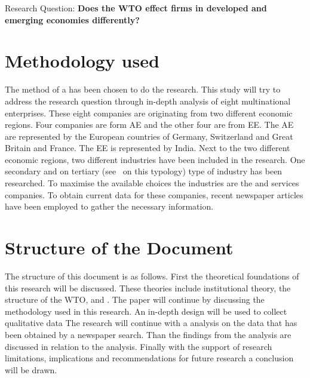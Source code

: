 Research Question: \textbf{Does the WTO effect firms in developed and emerging economies differently?}

\section{Methodology used}
The method of a \mcs has been chosen to do the research.
This study will try to address the research question through in-depth \mcs analysis of eight  multinational enterprises.
These eight companies are originating from two different economic regions.
Four companies are form \gls{AE} and the other four are from \gls{EE}.
The AE are represented by the European countries of Germany, Switzerland and Great Britain and France.
The EE is represented by India.
Next to the two different economic regions, two different industries have been included in the research.
One secondary and on tertiary (see~\cite{Fisher:1939} on this typology) type of industry has been researched.
To maximise the available choices the industries are the \manu and services companies.
To obtain current data for these companies, recent newspaper articles have been employed to gather the necessary information.


\section{Structure of the Document}

The structure of this document is as follows. 
First the theoretical foundations of this research will be discussed. 
These theories include institutional theory, the structure of the WTO, and .
The paper will continue by discussing the methodology used in this research.
An in-depth \mcs design will be used to collect qualitative data 
The research will continue with a analysis on the data that has been obtained by a newspaper search.
Than the findings from the analysis are discussed in relation to the \mcs analysis.
Finally with the support of
research limitations, implications and recommendations for future research a conclusion will be drawn.
